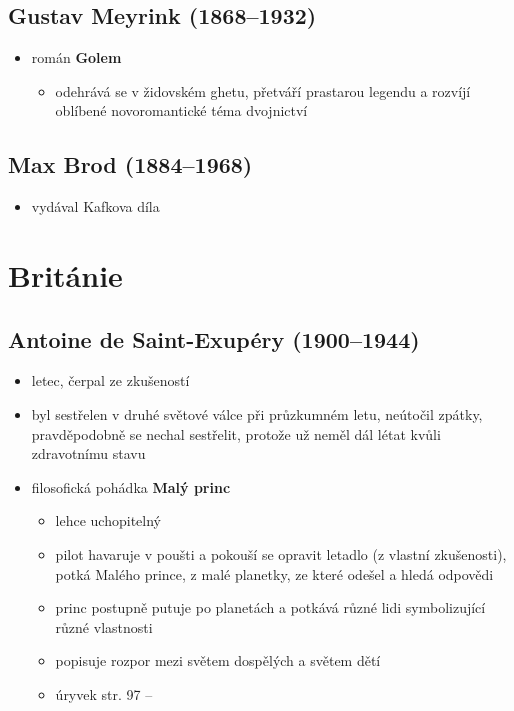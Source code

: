 \subsection{Gustav Meyrink (1868--1932)}
\begin{itemize}
\item román \textbf{Golem}
	\begin{itemize}
	\item odehrává se v židovském ghetu, přetváří prastarou legendu a rozvíjí oblíbené novoromantické téma dvojnictví
	\end{itemize}
\end{itemize}

\subsection{Max Brod (1884--1968)}
\begin{itemize}
\item vydával Kafkova díla
\end{itemize}

\section{Británie}
\subsection{Antoine de Saint-Exupéry (1900--1944)}
\begin{itemize}
\item letec, čerpal ze zkušeností
\item byl sestřelen v druhé světové válce při průzkumném letu, neútočil zpátky, pravděpodobně se nechal sestřelit, protože už neměl dál létat kvůli zdravotnímu stavu
\item filosofická pohádka \textbf{Malý princ}
	\begin{itemize}
	\item lehce uchopitelný 
	\item pilot havaruje v poušti a pokouší se opravit letadlo (z vlastní zkušenosti), potká Malého prince, z malé planetky, ze které odešel a hledá odpovědi
	\item princ postupně putuje po planetách a potkává různé lidi symbolizující různé vlastnosti
	\item popisuje rozpor mezi světem dospělých a světem dětí
	\item úryvek str. 97 -- 
	\end{itemize}	 
\end{itemize}

